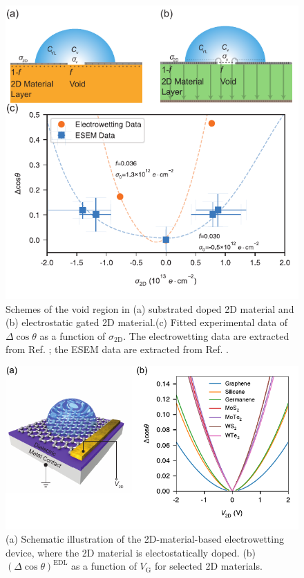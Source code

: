 \documentclass[journal=jacsat,manuscript=article,email=true,hyperref=true,keywords=true]{achemso}
\begin{document}
\begin{figure}[htbp]
\centering
\includegraphics[width=0.95\linewidth]{../img/plot-fitting.pdf}
\caption{\label{fig:f-nc-exp}
Schemes of the void region in (a) substrated doped 2D material and (b) electrostatic gated 2D material.(c) Fitted experimental data of \(\Delta\cos\theta\) as a function of \(\sigma_{\mathrm{2D}}\). The electrowetting data are extracted from Ref. ; the ESEM data are extracted from Ref. .}
\end{figure}


\begin{figure}[htbp]
\centering
\includegraphics[width=0.65\linewidth]{../img/dcos-all-2D.pdf}
\caption{\label{fig:dcos-all-2D}
(a) Schematic illustration of the 2D-material-based electrowetting device, where the 2D material is electostatically doped. (b) \((\Delta\cos\theta)^{\mathrm{EDL}}\) as a function of \(V_{\mathrm{G}}\) for selected 2D materials.}
\end{figure}
\end{document}
